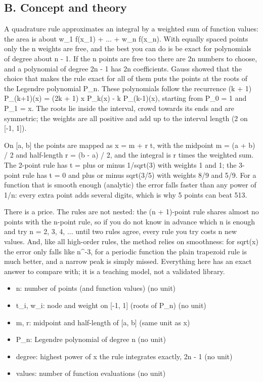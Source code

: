 \documentclass[11pt,a4paper]{article}
\begin{document}
\subsection*{B. Concept and theory}
A quadrature rule approximates an integral by a weighted sum of function values: the area is about w\_1 f(x\_1) + ... + w\_n f(x\_n). With equally spaced points only the n weights are free, and the best you can do is be exact for polynomials of degree about n - 1. If the n points are free too there are 2n numbers to choose, and a polynomial of degree 2n - 1 has 2n coefficients. Gauss showed that the choice that makes the rule exact for all of them puts the points at the roots of the Legendre polynomial P\_n. These polynomials follow the recurrence (k + 1) P\_(k+1)(x) = (2k + 1) x P\_k(x) - k P\_(k-1)(x), starting from P\_0 = 1 and P\_1 = x. The roots lie inside the interval, crowd towards its ends and are symmetric; the weights are all positive and add up to the interval length (2 on [-1, 1]).

On [a, b] the points are mapped as x = m + r t, with the midpoint m = (a + b) / 2 and half-length r = (b - a) / 2, and the integral is r times the weighted sum. The 2-point rule has t = plus or minus 1/sqrt(3) with weights 1 and 1; the 3-point rule has t = 0 and plus or minus sqrt(3/5) with weights 8/9 and 5/9. For a function that is smooth enough (analytic) the error falls faster than any power of 1/n: every extra point adds several digits, which is why 5 points can beat 513.

There is a price. The rules are not nested: the (n + 1)-point rule shares almost no points with the n-point rule, so if you do not know in advance which n is enough and try n = 2, 3, 4, ... until two rules agree, every rule you try costs n new values. And, like all high-order rules, the method relies on smoothness: for sqrt(x) the error only falls like n\textasciicircum{}-3, for a periodic function the plain trapezoid rule is much better, and a narrow peak is simply missed. Everything here has an exact answer to compare with; it is a teaching model, not a validated library.

\begin{itemize}[nosep]
\item n: number of points (and function values) (no unit)
\item t\_i, w\_i: node and weight on [-1, 1] (roots of P\_n) (no unit)
\item m, r: midpoint and half-length of [a, b] (same unit as x)
\item P\_n: Legendre polynomial of degree n (no unit)
\item degree: highest power of x the rule integrates exactly, 2n - 1 (no unit)
\item values: number of function evaluations (no unit)
\end{itemize}
\end{document}
